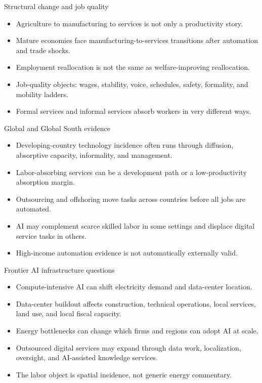 \documentclass[aspectratio=169,11pt]{beamer}
\begin{document}
\begin{frame}{Structural change and job quality}
\begin{itemize}
    \item Agriculture to manufacturing to services is not only a productivity story.
    \item Mature economies face manufacturing-to-services transitions after automation and trade shocks.
    \item Employment reallocation is not the same as welfare-improving reallocation.
    \item Job-quality objects: wages, stability, voice, schedules, safety, formality, and mobility ladders.
    \item Formal services and informal services absorb workers in very different ways.
\end{itemize}
\end{frame}

\begin{frame}{Global and Global South evidence}
\begin{itemize}
    \item Developing-country technology incidence often runs through diffusion, absorptive capacity, informality, and management.
    \item Labor-absorbing services can be a development path or a low-productivity absorption margin.
    \item Outsourcing and offshoring move tasks across countries before all jobs are automated.
    \item AI may complement scarce skilled labor in some settings and displace digital service tasks in others.
    \item High-income automation evidence is not automatically externally valid.
\end{itemize}
\end{frame}

\begin{frame}{Frontier AI infrastructure questions}
\begin{itemize}
    \item Compute-intensive AI can shift electricity demand and data-center location.
    \item Data-center buildout affects construction, technical operations, local services, land use, and local fiscal capacity.
    \item Energy bottlenecks can change which firms and regions can adopt AI at scale.
    \item Outsourced digital services may expand through data work, localization, oversight, and AI-assisted knowledge services.
    \item The labor object is spatial incidence, not generic energy commentary.
\end{itemize}
\end{frame}
\end{document}
